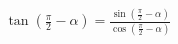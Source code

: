 \documentclass[preview]{standalone}
\begin{document}
\begin{align*}
\tan(\frac{\pi}{2}-\alpha) = \frac{\sin(\frac{\pi}{2}-\alpha)}{\cos(\frac{\pi}{2}-\alpha)}
\end{align*}
\end{document}
